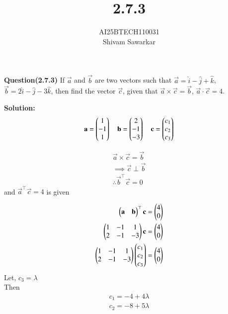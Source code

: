 \documentclass[journal]{IEEEtran}
\begin{document}

\vspace{3cm}

\title{2.7.3}
\author{AI25BTECH110031 \\ Shivam Sawarkar}
 \maketitle
{\let\newpage\relax\maketitle}

\renewcommand{\thefigure}{\theenumi}
\renewcommand{\thetable}{\theenumi}
\setlength{\intextsep}{10pt} %


\renewcommand{\thetable}{\theenumi}

\textbf{Question(2.7.3)}
If $\vec{a}$ and $\vec{b}$ are two vectors such that $\vec{a} = \hat{i} - \hat{j} + \hat{k}$, $\vec{b} = 2\hat{i} - \hat{j} - 3\hat{k}$, then find the vector $\vec{c}$, given that $\vec{a} \times \vec{c} = \vec{b}$, $\vec{a} \cdot \vec{c} = 4$.


\textbf{Solution:}  
\begin{align}
\mathbf{a} = \begin{pmatrix}1 \\ -1 \\ 1\end{pmatrix} \quad 
\mathbf{b} = \begin{pmatrix}2 \\ -1 \\ -3\end{pmatrix} \quad 
\mathbf{c} = \begin{pmatrix}c_1 \\ c_2 \\ c_3\end{pmatrix}
\end{align}

\begin{align}
\vec{a}\times\vec{c} = \vec{b} \\ 
\implies \vec{c} \perp \vec{b} \\ 
\therefore \vec{b}^\top\vec{c}=0
\end{align}
and $\vec{a}^\top\vec{c}=4$ is given

\begin{align}
    \begin{pmatrix}\mathbf{a} & \mathbf{b}\end{pmatrix}^\top\mathbf{c}=\begin{pmatrix}4 \\ 0\end{pmatrix} \\ 
    \begin{pmatrix}1 & -1 & 1 \\ 
           2 & -1 & -3\end{pmatrix}\mathbf{c}=\begin{pmatrix}4 \\ 0\end{pmatrix} \\ 
    \begin{pmatrix}1 & -1 & 1 \\ 
    2 & -1 & -3\end{pmatrix}\begin{pmatrix}c_1 \\ c_2 \\ c_3\end{pmatrix}= \begin{pmatrix}4 \\ 0\end{pmatrix}
\end{align}
Let, $c_3=\lambda$ \\
Then 
\begin{align}
c_1=-4+4\lambda \\ 
c_2=-8+5\lambda
\end{align}
\end{document}
